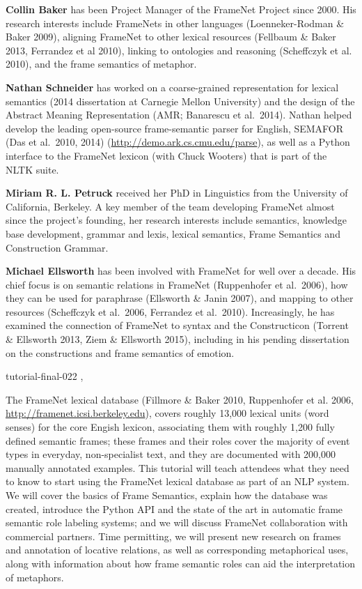 \begin{bio}
  {\bfseries Collin Baker} has been Project Manager of the FrameNet Project since 2000. His research interests include FrameNets in other languages (Loenneker-Rodman \& Baker 2009), aligning FrameNet to other lexical resources (Fellbaum \& Baker 2013, Ferrandez et al 2010), linking to ontologies and reasoning (Scheffczyk et al. 2010), and the frame semantics of metaphor.

  {\bfseries Nathan Schneider} has worked on a coarse-grained representation for lexical semantics (2014 dissertation at Carnegie Mellon University) and the design of the Abstract Meaning Representation (AMR; Banarescu et al.\ 2014). Nathan helped develop the leading open-source frame-semantic parser for English, SEMAFOR (Das et al.\ 2010, 2014) (\url{http://demo.ark.cs.cmu.edu/parse}), as well as a Python interface to the FrameNet lexicon (with Chuck Wooters) that is part of the NLTK suite.

  {\bfseries Miriam R. L. Petruck} received her PhD in Linguistics from the University of California, Berkeley. A key member of the team developing FrameNet almost since the project’s founding, her research interests include semantics, knowledge base development, grammar and lexis, lexical semantics, Frame Semantics and Construction Grammar.

  {\bfseries Michael Ellsworth}  has been involved with FrameNet for well over a decade. His chief focus is on semantic relations in FrameNet (Ruppenhofer et al.\ 2006), how they can be used for paraphrase (Ellsworth \& Janin 2007), and mapping to other resources (Scheffczyk et al.\ 2006, Ferrandez et al.\ 2010). Increasingly, he has examined the connection of FrameNet to syntax and the Constructicon (Torrent \& Ellsworth 2013, Ziem \& Ellsworth 2015), including in his pending dissertation on the constructions and frame semantics of emotion.
\end{bio}

\begin{tutorial}
  {tutorial-final-022}
  {\daydateyear, \tutorialafternoontime}
  {\TutLocF}

The FrameNet lexical database (Fillmore \& Baker 2010, Ruppenhofer et
al. 2006, \url{http://framenet.icsi.berkeley.edu}), covers roughly
13,000 lexical units (word senses) for the core Engish lexicon,
associating them with roughly 1,200 fully defined semantic frames;
these frames and their roles cover the majority of event types in
everyday, non-specialist text, and they are documented with 200,000
manually annotated examples. This tutorial will teach attendees what
they need to know to start using the FrameNet lexical database as part
of an NLP system. We will cover the basics of Frame Semantics, explain
how the database was created, introduce the Python API and the state
of the art in automatic frame semantic role labeling systems; and we
will discuss FrameNet collaboration with commercial partners. Time
permitting, we will present new research on frames and annotation of
locative relations, as well as corresponding metaphorical uses, along
with information about how frame semantic roles can aid the
interpretation of metaphors.

\end{tutorial} 
